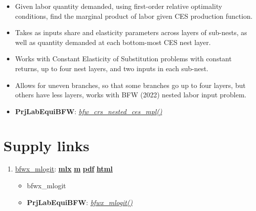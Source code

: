 \documentclass[
]{book}
\providecommand{\tightlist}{%
  \setlength{\itemsep}{0pt}\setlength{\parskip}{0pt}}
\begin{document}
\begin{enumerate}
  \begin{itemize}
  \tightlist
  \item
    Given labor quantity demanded, using first-order relative optimality conditions, find the marginal product of labor given CES production function.
  \item
    Takes as inputs share and elasticity parameters across layers of sub-nests, as well as quantity demanded at each bottom-most CES nest layer.
  \item
    Works with Constant Elasticity of Substitution problems with constant returns, up to four nest layers, and two inputs in each sub-nest.
  \item
    Allows for uneven branches, so that some branches go up to four layers, but others have less layers, works with BFW (2022) nested labor input problem.
  \item
    \textbf{PrjLabEquiBFW}: \emph{\href{https://github.com/FanWangEcon/PrjLabEquiBFW/blob/main/PrjLabEquiBFW/solvedemand/bfw_crs_nested_ces_mpl.m}{bfw\_crs\_nested\_ces\_mpl()}}
  \end{itemize}
\end{enumerate}

\hypertarget{supply-links}{%
\section{Supply links}\label{supply-links}}

\begin{enumerate}
\def\labelenumi{\arabic{enumi}.}
\tightlist
\item
  \href{https://fanwangecon.github.io/PrjLabEquiBFW/PrjLabEquiBFW/doc/solvesupply/htmlpdfm/bfwx_mlogit.html}{bfwx\_mlogit}: \href{https://github.com/FanWangEcon/PrjLabEquiBFW/blob/master/PrjLabEquiBFW/doc/solvesupply/bfwx_mlogit.mlx}{\textbf{mlx}} \textbar{} \href{https://github.com/FanWangEcon/PrjLabEquiBFW/blob/master/PrjLabEquiBFW/doc/solvesupply/htmlpdfm/bfwx_mlogit.m}{\textbf{m}} \textbar{} \href{https://github.com/FanWangEcon/PrjLabEquiBFW/blob/master/PrjLabEquiBFW/doc/solvesupply/htmlpdfm/bfwx_mlogit.pdf}{\textbf{pdf}} \textbar{} \href{https://fanwangecon.github.io/PrjLabEquiBFW/PrjLabEquiBFW/doc/solvesupply/htmlpdfm/bfwx_mlogit.html}{\textbf{html}}

  \begin{itemize}
  \tightlist
  \item
    bfwx\_mlogit
  \item
    \textbf{PrjLabEquiBFW}: \emph{\href{https://github.com/FanWangEcon/PrjLabEquiBFW/blob/main/PrjLabEquiBFW/solvesupply/bfwx_mlogit.m}{bfwx\_mlogit()}}
  \end{itemize}
\end{enumerate}

  
\end{document}
